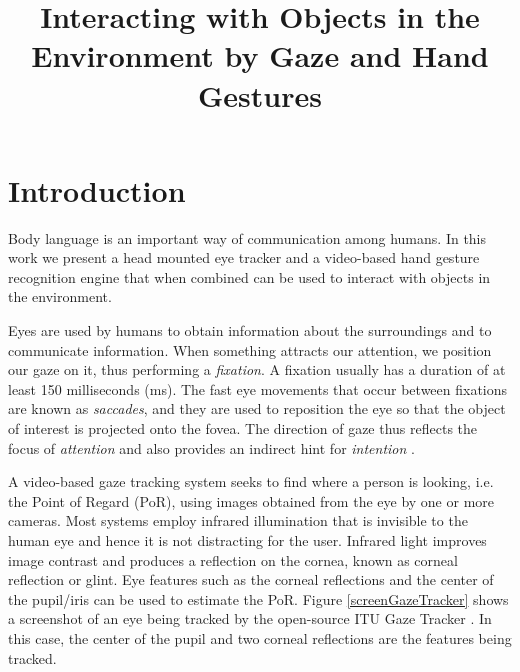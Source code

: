 \documentclass[jou,a4paper,notxfonts]{apa}
\title{Interacting with Objects in the Environment by Gaze and Hand Gestures} %
\begin{document}
\maketitle%

\thispagestyle{plain}

\section{Introduction} 
Body language is an important way of communication among humans. In this work we present a head mounted eye tracker and
a video-based hand gesture recognition engine that when combined can be used to interact with objects in the
environment.

Eyes are used by humans to obtain information about the surroundings and to communicate information. When something
attracts our attention, we position our gaze on it, thus performing a \textit{fixation}. A fixation usually has a
duration of at least 150 milliseconds (ms). The fast eye movements that occur between fixations are known as
\textit{saccades}, and they are used to reposition the eye so that the object of interest is projected onto the fovea.
The direction of gaze thus reflects the focus of \textit{attention} and also provides an indirect hint for
\textit{intention} \cite{velichkovsky}.


A video-based gaze tracking system seeks to find where a person is looking, i.e. the Point of Regard (PoR), using images
obtained from the eye by one or more cameras. Most systems employ infrared illumination that is invisible to the human
eye and hence it is not distracting for the user. Infrared light improves image contrast and produces a reflection on
the cornea, known as corneal reflection or glint. Eye features such as the corneal reflections and the center of the
pupil/iris can be used to estimate the PoR. Figure \ref{screenGazeTracker} shows a screenshot of an eye being tracked by
the open-source ITU Gaze Tracker \cite{lowcostitugazetracker,Rozado2012}. In this case, the center of the pupil and two
corneal reflections are the features being tracked.
\end{document}
